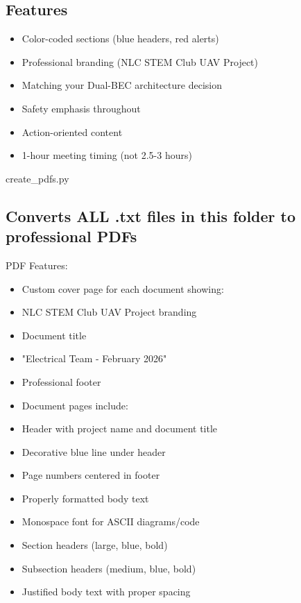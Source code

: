 \documentclass[11pt,letterpaper]{article}
\begin{document}
\subsection{Features}

\begin{itemize}
  \item Color-coded sections (blue headers, red alerts)
  \item Professional branding (NLC STEM Club UAV Project)
  \item Matching your Dual-BEC architecture decision
  \item Safety emphasis throughout
  \item Action-oriented content
  \item 1-hour meeting timing (not 2.5-3 hours)
\end{itemize}

create\_pdfs.py\par

\subsection{Converts ALL .txt files in this folder to professional PDFs}

PDF Features:\par

\begin{itemize}
  \item Custom cover page for each document showing:
  \item NLC STEM Club UAV Project branding
  \item Document title
  \item "Electrical Team - February 2026"
  \item Professional footer
\end{itemize}

\begin{itemize}
  \item Document pages include:
  \item Header with project name and document title
  \item Decorative blue line under header
  \item Page numbers centered in footer
  \item Properly formatted body text
  \item Monospace font for ASCII diagrams/code
  \item Section headers (large, blue, bold)
  \item Subsection headers (medium, blue, bold)
  \item Justified body text with proper spacing
\end{itemize}
\end{document}
